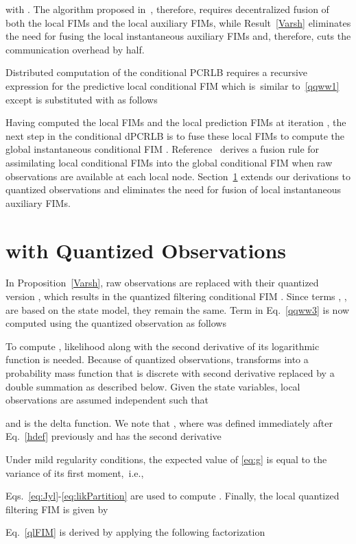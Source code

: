 \documentclass[10pt,twocolumn,twoside]{IEEEtran}
\begin{document}
with .
The  algorithm proposed in~\cite{Arash:SPL}, therefore, requires decentralized
 fusion  of both the local FIMs and the local auxiliary FIMs, while
Result~\ref{Varsh}
eliminates the need for fusing the local instantaneous auxiliary FIMs and, therefore,  cuts the communication overhead by half.

Distributed computation of the conditional PCRLB requires a recursive expression for the predictive local conditional FIM  which is~similar to~\eqref{qqww1} except  is
substituted with  as follows

Having computed the  local FIMs  and the local prediction FIMs
  at iteration , the next step in the conditional dPCRLB
 is to fuse these local FIMs to compute the global instantaneous conditional FIM
 .  Reference~\cite{Arash:SPL} derives a fusion rule for
 assimilating local conditional FIMs into the global conditional FIM
 when raw observations are available at each local node.
Section~\ref{QdPCRLB} extends our derivations
 to quantized observations and eliminates the need for fusion of local instantaneous auxiliary FIMs.
\section{ with Quantized Observations} \label{QdPCRLB}
In Proposition~\ref{Varsh}, raw observations  are replaced with
their quantized version , which results in the quantized
filtering conditional FIM .  Since terms
, ,
 are based on the state model, they remain the
same. Term  in Eq.~\eqref{qqww3} is now
computed using the quantized observation as follows

To compute , likelihood
 along with the second derivative of
its logarithmic function is needed. Because of quantized observations,
 transforms into a probability mass
function that is discrete with second derivative replaced by a double
summation as described below.
Given the state variables, local observations are assumed independent
such that

and  is the delta function. We note that
, where  was
defined immediately after Eq.~\eqref{hdef} previously and has the
second derivative

Under mild regularity conditions, the expected value of
\eqref{eq:g} is equal to the variance of its first moment,~i.e.,

Eqs.~\eqref{eq:Jyl}-\eqref{eq:likPartition} are used to compute
.  Finally, the local quantized
filtering FIM is given by

Eq.~\eqref{qlFIM} is derived  by applying the following factorization
\end{document}

